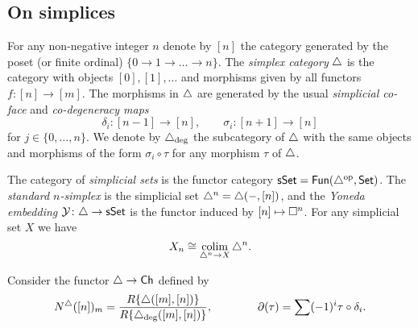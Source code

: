 
\subsection{On simplices}

For any non-negative integer $n$ denote by $[n]$ the category generated by the poset (or finite ordinal) $\{0 \to 1 \to \dots \to n\}$.
The \textit{simplex category} $\triangle$ is the category with objects $[0], [1], \dots$ and morphisms given by all functors $f \colon [n] \to [m]$.
The morphisms in $\triangle$ are generated by the usual
\textit{simplicial co-face} and \textit{co-degeneracy maps}
\begin{equation*}
\delta_i \colon [n-1] \to [n], \qquad \sigma_i \colon [n+1] \to [n]
\end{equation*}
for $j \in \{0, \dots, n\}$.
We denote by $\triangle_{\deg}$ the subcategory of $\triangle$ with the same objects and morphisms of the form $\sigma_i \circ \tau$ for any morphism $\tau$ of $\triangle$.

The category of \textit{simplicial sets} is the functor category $\mathsf{sSet} = \mathsf{Fun}(\triangle^{\mathrm{op}}, \mathsf{Set})$.
The \textit{standard $n$-simplex} is the simplicial set $\triangle^n = \triangle(-, [n])$, and the \textit{Yoneda embedding} $\mathcal{Y} \colon \triangle \to \mathsf{sSet}$ is the functor induced by $[n] \mapsto \square^n$.
For any simplicial set $X$ we have
\begin{equation*}
X_n \cong \operatorname*{colim}_{\triangle^n \to X} \triangle^n.
\end{equation*}

Consider the functor $\triangle \to \mathsf{Ch}$ defined by
\begin{equation*}
N^{\triangle}([n])_m = \frac{R\{\triangle([m], [n])\}}{R\{\triangle_{\deg}([m], [n])\}},
\qquad \qquad
\partial(\tau) = \sum (-1)^i \tau \circ \delta_i.
\end{equation*}

